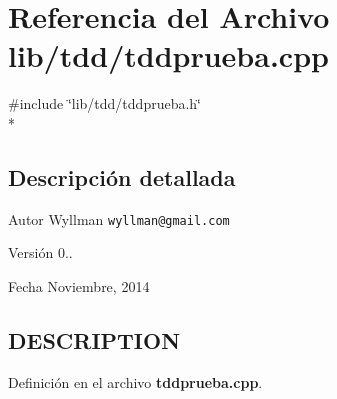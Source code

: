 \section{Referencia del Archivo lib/tdd/tddprueba.cpp}
\label{tddprueba_8cpp}
{\ttfamily \#include \char`\"{}lib/tdd/tddprueba.\+h\char`\"{}}\\*


\subsection{Descripción detallada}
\begin{DoxyAuthor}{Autor}
Wyllman {\tt wyllman@gmail.\+com} 
\end{DoxyAuthor}
\begin{DoxyVersion}{Versión}
0.. 
\end{DoxyVersion}
\begin{DoxyDate}{Fecha}
Noviembre, 2014 
\end{DoxyDate}
\subsection{D\+E\+S\+C\+R\+I\+P\+T\+I\+O\+N}\label{main_8cpp_DESCRIPTION}


Definición en el archivo {\bf tddprueba.\+cpp}.

